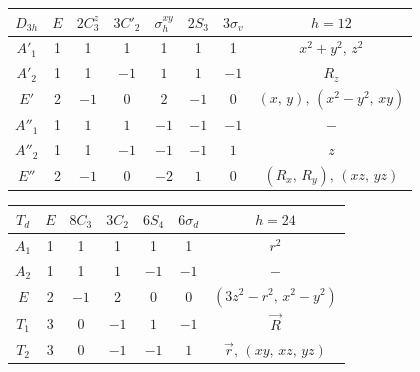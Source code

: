 \begin{center}
\begin{tabular}{ |c|c|c|c|c|c|c|c| }
 \hline
 $D_{3h}$ & $E$ & $2C_3^z$ & $3C'_2$ & $\sigma_h^{xy}$ & $2S_{3}$ & $3\sigma_{v}$ & $h=12$ \\
 \hline
 $A'_1$ & 1 & 1 & 1 & 1 & 1 & 1 & $x^2+y^2,\,z^2$ \\
 \hline
 $A'_{2}$ & 1 & 1 & $-1$ & $1$ & $1$ & $-1$ & $R_z$ \\
 \hline
 $E'$ & 2 & $-1$ & $0$ & $2$ & $-1$ & $0$ & $(x,\,y),\,(x^2-y^2,\,xy)$ \\
 \hline
 $A''_{1}$ & 1 & $1$ & $1$ & $-1$ & $-1$ & $-1$ & $-$ \\
 \hline
 $A''_2$ & 1 & 1 & $-1$ & $-1$ & $-1$ & $1$ &  $z$ \\
 \hline
 $E''$ & 2 & $-1$ & $0$ & $-2$ & $1$ & $0$ & $(R_x,\,R_y),\,(xz,\,yz)$ \\
 \hline
\end{tabular}
\end{center}

\begin{center}
\begin{tabular}{ |c|c|c|c|c|c|c| }
 \hline
 $T_{d}$ & $E$ & $8C_3$ & $3C_2$ & $6S_4$ & $6\sigma_d$ & $h=24$ \\
 \hline
 $A_1$ & 1 & 1 & 1 & 1 & 1 & $r^2$ \\
 \hline
 $A_2$ & 1 & 1 & $1$ & $-1$ & $-1$ & $-$ \\
 \hline
 $E$ & 2 & $-1$ & 2 & 0 & $0$ & $(3z^2-r^2,\,x^2-y^2)$ \\
 \hline
 $T_1$ & 3 & $0$ & $-1$ & $1$ & $-1$ & $\vec{R}$ \\
 \hline
 $T_2$ & 3 & $0$ & $-1$ & $-1$ & $1$ & $\vec{r},\,(xy,\,xz,\,yz)$ \\
 \hline
\end{tabular}
\end{center}

